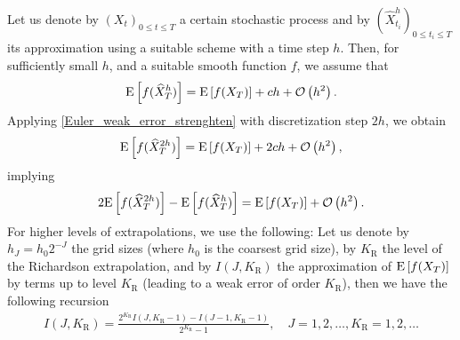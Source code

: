 Let us denote by $(X_t)_{0 \le t \le T}$ a certain stochastic process and by $(\hat{X}_{t_i}^h)_{0 \le  t_i \le T}$ its approximation using a suitable  scheme with a time step $h$.  Then, for sufficiently small $h$, and a suitable smooth function $f$, we assume that
\begin{align}\label{Euler_weak_error_strenghten}
	\mathrm{E}\left[f(\widehat{X}_T^h)\right]= \mathrm{E}\left[f(X_T)\right] + c h +{\mathcal{O}}\left(h^2\right) .
\end{align}
Applying \eqref{Euler_weak_error_strenghten} with discretization step $2h$, we  obtain
\begin{align*}
	\mathrm{E}\left[f(\widehat{X}_T^{2h})\right]= \mathrm{E}\left[f(X_T)\right] + 2 c h +{\mathcal{O}}\left(h^2\right) ,
\end{align*}
implying
\begin{align*}
	2 \mathrm{E}\left[f(\widehat{X}_T^{2h})\right]- \mathrm{E}\left[f(\widehat{X}_T^{h})\right] =\mathrm{E}\left[f(X_T)\right] + {\mathcal{O}}\left(h^2\right) .
\end{align*}
For higher levels of extrapolations, we use the following: Let us denote by $h_J=h_0 2^{-J}$ the grid sizes (where $h_0$ is the coarsest grid size), by $K_\text{R}$ the level of the Richardson extrapolation, and by $I(J,K_\text{R})$ the approximation of $\mathrm{E}\left[f(X_T)\right]$ by terms up to level $K_\text{R}$ (leading to a weak error of order $K_\text{R}$), then we have the following recursion 
\begin{align*}
I(J,K_\text{R})=\frac{2^{K_\text{R}}I(J,K_\text{R}-1)-I(J-1,K_\text{R}-1)}{2^{K_\text{R}}-1},\quad J=1,2,\dots, K_\text{R}=1,2,\dots
\end{align*}

